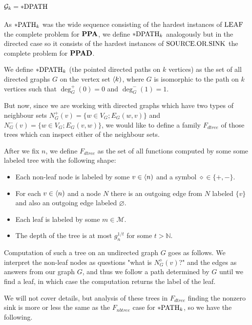 \section{$\mathcal{G}_k=*\text{DPATH}$}\label{secpDPATH}

As $*\text{PATH}_k$ was the wide sequence consisting of the hardest instances of $\text{LEAF}$ the complete problem for $\textbf{PPA}$, we define $*\text{DPATH}_k$ analogously but in the directed case so it consists of the hardest instances of $\text{SOURCE.OR.SINK}$ the complete problem for $\textbf{PPAD}$.


\begin{defi}
We define $*\text{DPATH}_k$ (the pointed directed paths on $k$ vertices) as the set of all directed graphs $G$ on the vertex set $\langle k)$, where $G$ is isomorphic to the path on $k$ vertices such that $\deg_G^{+}(0)=0$ and $\deg_G^{-}(1)=1$.
\end{defi}

But now, since we are working with directed graphs which have two types of neighbour sets $N_G^+(v)=\{w\in V_G;E_G(w,v)\}$ and $N_G^-(v)=\{w\in V_G;E_G(v,w)\}$, we would like to define a family $F_{dtree}$ of those trees which can inspect either of the neighbour sets.

\begin{defi}
After we fix $n$, we define $F_{dtree}$ as the set of all functions computed by some some labeled tree with the following shape:

\begin{itemize}
\item Each non-leaf node is labeled by some $v\in\langle n)$ and a symbol $\diamond\in\{+,-\}$. 
\item For each $v \in \langle n)$ and a node $N$ there is an outgoing edge from $N$ labeled $\{v\}$ and also an outgoing edge labeled $\varnothing$.
\item Each leaf is labeled by some $m\in \mathcal{M}$.
\item The depth of the tree is at most $g_n^{1/t}$ for some $t>\mathbb{N}$.
\end{itemize}

Computation of such a tree on an undirected graph $G$ goes as follows. We interpret the non-leaf nodes as questions "what is $N_G^\diamond(v)$?" and the edges as answers from our graph $G$, and thus we follow a path determined by $G$ until we find a leaf, in which case the computation returns the label of the leaf.
\end{defi}

We will not cover details, but analysis of these trees in $F_{dtree}$ finding the nonzero sink is more or less the same as the $F_{nbtree}$ case for $*\text{PATH}_k$, so we have the following.


